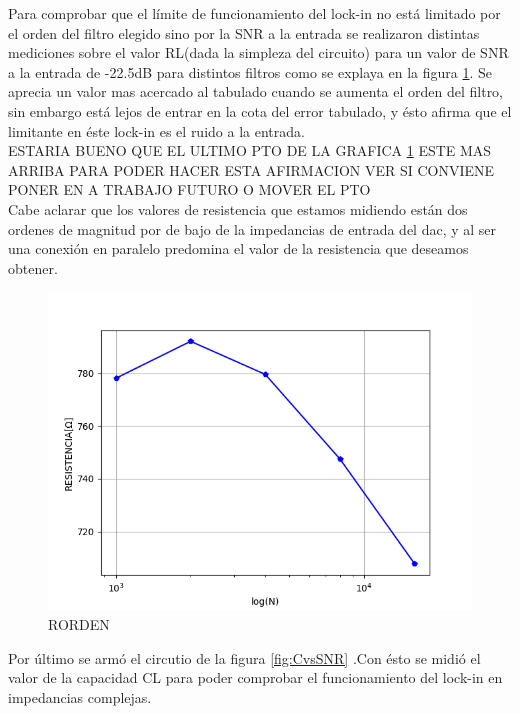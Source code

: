 \documentclass[11pt,a4paper]{extarticle}
\begin{document}
\begin{multicols}{2}
Para comprobar que el límite de funcionamiento 
del lock-in no está limitado por el orden del 
filtro elegido sino por la SNR a la entrada
se realizaron distintas mediciones 
sobre el valor RL(dada la simpleza del circuito) 
para un valor de SNR a la entrada de -22.5dB para 
distintos filtros como se explaya en la figura 
\ref{fig:RORDEN}. Se aprecia un valor mas acercado 
al tabulado cuando se aumenta el orden del filtro, sin 
embargo está lejos de entrar en la cota del error 
tabulado, y ésto afirma que el limitante en éste 
lock-in es el ruido a la entrada.\\

ESTARIA BUENO QUE EL ULTIMO PTO DE LA GRAFICA \ref{fig:RORDEN}
ESTE MAS ARRIBA PARA PODER HACER ESTA AFIRMACION 
VER SI CONVIENE PONER EN A TRABAJO FUTURO O MOVER EL PTO\\

Cabe aclarar que los valores de resistencia que estamos
 midiendo están dos ordenes de magnitud por de 
 bajo de la impedancias de entrada del dac, y al ser 
una conexión en paralelo predomina el valor de la resistencia 
que deseamos obtener.\\

\begin{figure}[H]
	\centering
	\includegraphics[width=\linewidth]{Images/RORDEN.png}
	\caption{RORDEN}
	\label{fig:RORDEN}
\end{figure}

Por último se armó el circutio de la figura 
\ref{fig:CvsSNR} .Con ésto 
se midió el valor de la capacidad CL para poder 
comprobar el funcionamiento del lock-in en 
impedancias complejas.\\ 


\end{multicols}
\end{document}
